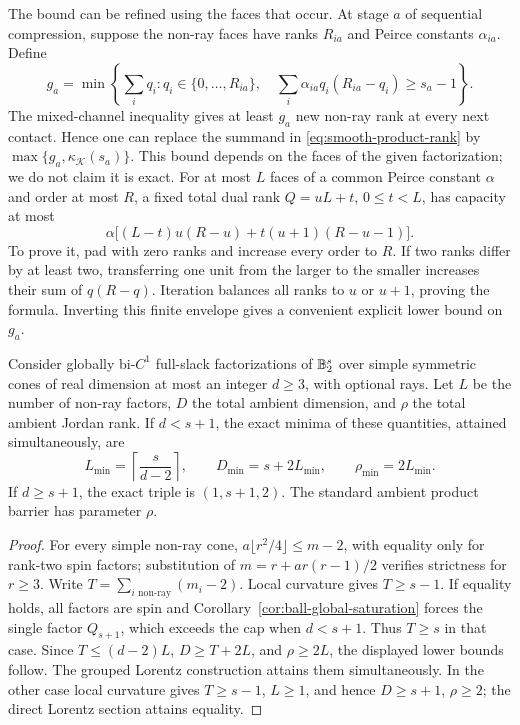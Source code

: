 The bound can be refined using the faces that occur. At stage
$a$ of sequential compression, suppose the non-ray faces have ranks $R_{ia}$ and Peirce
constants $\alpha_{ia}$. Define
\[
 g_a=\min\left\{\sum_iq_i:
 q_i\in\{0,\ldots,R_{ia}\},\quad
 \sum_i\alpha_{ia}q_i(R_{ia}-q_i)\geq s_a-1\right\}.
\]
The mixed-channel inequality gives at least $g_a$ new non-ray rank at
every next contact. Hence one can replace the summand in
\eqref{eq:smooth-product-rank} by
$\max\{g_a,\kappa_{\mathscr K}(s_a)\}$. This bound depends on the
faces of the given factorization; we do not claim it is exact. For
at most $L$ faces of a common Peirce
constant $\alpha$ and order at most $R$, a fixed total dual rank
$Q=uL+t$, $0\leq t<L$, has capacity at most
\[
 \alpha\big[(L-t)u(R-u)+t(u+1)(R-u-1)\big].
\]
To prove it, pad with zero ranks and increase every order to $R$.
If two ranks differ by at least two, transferring one unit from the
larger to the smaller increases their sum of $q(R-q)$. Iteration
balances all ranks to $u$ or $u+1$, proving the formula. Inverting this
finite envelope gives a convenient explicit lower bound on $g_a$.

\begin{corollary}
\label{cor:smooth-symmetric-resources}
Consider globally bi-$C^1$ full-slack factorizations of $\mathbb B_2^s$ over
simple symmetric cones of real dimension at most an integer $d\geq3$, with optional
rays. Let $L$ be the number of non-ray factors, $D$ the total ambient
dimension, and $\rho$ the total ambient Jordan rank. If $d<s+1$, the
exact minima of these quantities, attained simultaneously, are
\[
 L_{\min}=\left\lceil\frac{s}{d-2}\right\rceil,\qquad
 D_{\min}=s+2L_{\min},\qquad\rho_{\min}=2L_{\min}.
\]
If $d\geq s+1$, the exact triple is $(1,s+1,2)$.
The standard ambient product barrier has parameter $\rho$.
\end{corollary}
\begin{proof}
For every simple non-ray cone,
$a\lfloor r^2/4\rfloor\leq m-2$, with equality only for rank-two
spin factors; substitution of $m=r+ar(r-1)/2$ verifies strictness
for $r\geq3$. Write $T=\sum_{i\text{ non-ray}}(m_i-2)$.
Local curvature gives $T\geq s-1$. If equality holds, all factors are
spin and Corollary~\ref{cor:ball-global-saturation} forces the single
factor $Q_{s+1}$, which exceeds the cap when $d<s+1$. Thus $T\geq s$
in that case.
Since $T\leq(d-2)L$, $D\geq T+2L$, and $\rho\geq2L$, the displayed
lower bounds follow. The grouped Lorentz construction attains them
simultaneously. In the other case local curvature gives $T\geq s-1$,
$L\geq1$, and hence $D\geq s+1$, $\rho\geq2$; the direct Lorentz
section attains equality.
\end{proof}
